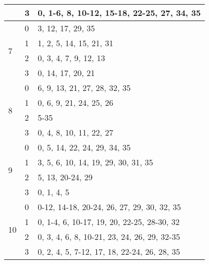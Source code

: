 \begin{table}[htb!]
\begin{tabular}{@{} |l||l||p{8cm}| @{}}
    & 3 & 0, 1-6, 8, 10-12, 15-18, 22-25, 27, 34, 35\\
    \hline
    \multirow{4}{*}{7} & 0 & 3, 12, 17, 29, 35\\
    & 1 & 1, 2, 5, 14, 15, 21, 31\\
    & 2 & 0, 3, 4, 7, 9, 12, 13\\
    & 3 & 0, 14, 17, 20, 21\\
    \hline
    \multirow{4}{*}{8} & 0 & 6, 9, 13, 21, 27, 28, 32, 35\\
    & 1 & 0, 6, 9, 21, 24, 25, 26\\
    & 2 & 5-35\\
    & 3 & 0, 4, 8, 10, 11, 22, 27\\
    \hline
    \multirow{4}{*}{9} & 0 & 0, 5, 14, 22, 24, 29, 34, 35\\
    & 1 & 3, 5, 6, 10, 14, 19, 29, 30, 31, 35\\
    & 2 & 5, 13, 20-24, 29\\
    & 3 & 0, 1, 4, 5\\
    \hline
    \multirow{4}{*}{10} & 0 & 0-12, 14-18, 20-24, 26, 27, 29, 30, 32, 35\\
    & 1 & 0, 1-4, 6, 10-17, 19, 20, 22-25, 28-30, 32\\
    & 2 & 0, 3, 4, 6, 8, 10-21, 23, 24, 26, 29, 32-35\\
    & 3 & 0, 2, 4, 5, 7-12, 17, 18, 22-24, 26, 28, 35\\
    \hline
  \end{tabular}
\end{table}

